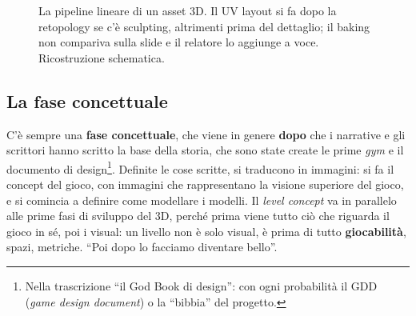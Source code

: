 \begin{figure}[htbp]
\centering
{}
\caption{La pipeline lineare di un asset 3D. Il UV layout si fa dopo la
retopology se c'è sculpting, altrimenti prima del dettaglio; il baking non
compariva sulla slide e il relatore lo aggiunge a voce. Ricostruzione
schematica.}
\label{p6:fig:pipeline}
\end{figure}

\subsection{La fase concettuale}

C'è sempre una \textbf{fase concettuale}, che viene in genere \textbf{dopo}
che i narrative e gli scrittori hanno scritto la base della storia, che sono
state create le prime \emph{gym} e il documento di design\footnote{Nella
trascrizione ``il God Book di design'': con ogni probabilità il GDD
(\emph{game design document}) o la ``bibbia'' del progetto.}. Definite le cose
scritte, si traducono in immagini: si fa il concept del gioco, con immagini che
rappresentano la visione superiore del gioco, e si comincia a definire come
modellare i modelli. Il \emph{level concept} va in parallelo alle prime fasi di
sviluppo del 3D, perché prima viene tutto ciò che riguarda il gioco in sé, poi
i visual: un livello non è solo visual, è prima di tutto \textbf{giocabilità},
spazi, metriche. ``Poi dopo lo facciamo diventare bello''.

